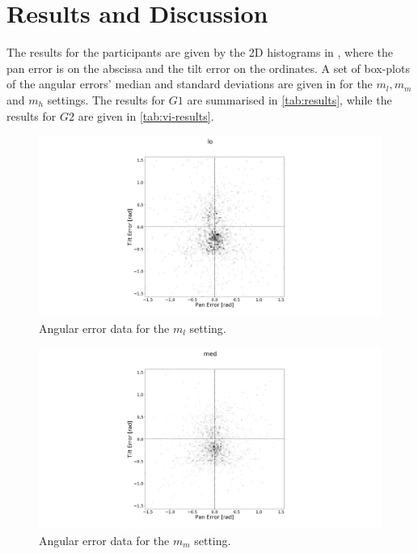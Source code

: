 \documentclass[sigconf, screen=true, anonymous=true]{acmart}
\begin{document}
\section{Results and Discussion}\label{sec:results}

The results for the participants are given by the 2D histograms in , where the pan error is on the abscissa and the tilt error on the ordinates.
A set of box-plots of the angular errors' median and standard deviations are given in  for the $m_l, m_m$ and $m_h$ settings. 
The results for $G1$ are summarised in \cref{tab:results}, while the results for $G2$ are given in \cref{tab:vi-results}.

\begin{figure}
  \centering
  \includegraphics[clip, trim=450 0 450 110, width=0.8\columnwidth]{figures/err_lo.png}
  \caption{Angular error data for the $m_l$ setting. }\label{fig:err-results-lo}
\end{figure}

\begin{figure}
  \centering
  \includegraphics[clip, trim=450 0 450 110, width=0.8\columnwidth]{figures/err_med.png}
  \caption{Angular error data for the $m_m$ setting. }\label{fig:err-results-med}
\end{figure}
\end{document}
